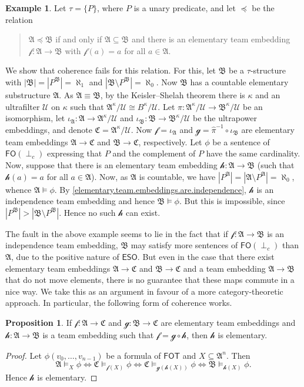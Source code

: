 \documentclass[a4paper]{amsart}
\theoremstyle{definition}
\newtheorem{proposition}[definition]{Proposition}
\newtheorem{example}[definition]{Example}
\theoremstyle{remark}
\newcommand{\A}{\mathcal{A}}
\newcommand{\B}{\mathcal{B}}
\newcommand{\C}{\mathcal{C}}
\newcommand{\U}{\mathcal{U}}
\newcommand\fot{\mathsf{FOT}}
\newcommand\eso{\mathsf{ESO}}
\newcommand\foil{\mathsf{FO}(\perp_c)}
\theoremstyle{definition}
\renewcommand{\A}{\mathfrak{A}}
\renewcommand{\B}{\mathfrak{B}}
\renewcommand{\C}{\mathfrak{C}}
\newcommand{\f}{\mathcal{f}}
\newcommand{\g}{\mathcal{g}}
\newcommand{\h}{\mathcal{h}}
\begin{document}
\begin{example}
    Let $\tau = \{P\}$, where $P$ is a unary predicate, and let $\preceq$ be the relation
    \begin{quote}
        $\A\preceq\B$ if and only if $\A\subseteq\B$ and there is an elementary team embedding $\f\colon\A\to\B$ with $\f(a) = a$ for all $a\in\A$.
    \end{quote}
    We show that coherence fails for this relation. For this, let $\B$ be a $\tau$-structure with $|\B| = |P^\B| = \aleph_1$ and $|\B\setminus P^\B| = \aleph_0$. Now $\B$ has a countable elementary substructure $\A$. As $\A\equiv\B$, by the Keisler--Shelah theorem there is $\kappa$ and an ultrafilter $\U$ on $\kappa$ such that $\A^\kappa/\U \cong B^\kappa/\U$. Let $\pi\colon\A^\kappa/\U\to\B^\kappa/\U$ be an isomorphism, let $\iota_\A\colon\A\to\A^\kappa/\U$ and $\iota_\B\colon\B\to\B^\kappa/\U$ be the ultrapower embeddings, and denote $\C = \A^\kappa/\U$. Now $\f = \iota_\A$ and $\g = \hat\pi^{-1}\circ\iota_\B$ are elementary team embeddings $\A\to\C$ and $\B\to\C$, respectively. Let $\phi$ be a sentence of $\foil$ expressing that $P$ and the complement of $P$ have the same cardinality. Now, suppose that there is an elementary team embedding $\h\colon\A\to\B$ (such that $\h(a) = a$ for all $a\in\A$). Now, as $\A$ is countable, we have $|P^\A| = |\A\setminus P^\A| = \aleph_0$, whence $\A\models\phi$. By \cref{elementary.team.embeddings.are.independence}, $\h$ is an independence team embedding and hence $\B\models\phi$. But this is impossible, since $|P^\B|>|\B\setminus P^\B|$. Hence no such $\h$ can exist.
\end{example}

The fault in the above example seems to lie in the fact that if $\f\colon\A\to\B$ is an independence team embedding, $\B$ may satisfy more sentences of $\foil$ than $\A$, due to the positive nature of $\eso$. But even in the case that there exist elementary team embeddings $\A\to\C$ and $\B\to\C$ and a team embedding $\A\to\B$ that do not move elements, there is no guarantee that these maps commute in a nice way. We take this as an argument in favour of a more category-theoretic approach. In particular, the following form of coherence works.

\begin{proposition}\label{prop:coherence}
    If $\f\colon\A\to\C$ and $\g\colon\B\to\C$ are elementary team embeddings and $\h\colon\A\to\B$ is a team embedding such that $\f = \g\circ\h$, then $\h$ is elementary.
\end{proposition}
\begin{proof}
    Let $\phi(v_0,\dots,v_{n-1})$ be a formula of $\fot$ and $X\subseteq\A^n$. Then
    \[
        \A\models_X\phi \iff \C\models_{\f(X)}\phi \iff \C\models_{\g(\h(X))}\phi \iff \B\models_{\h(X)}\phi.
    \]
    Hence $\h$ is elementary. \qedhere
\end{proof}
\end{document}
